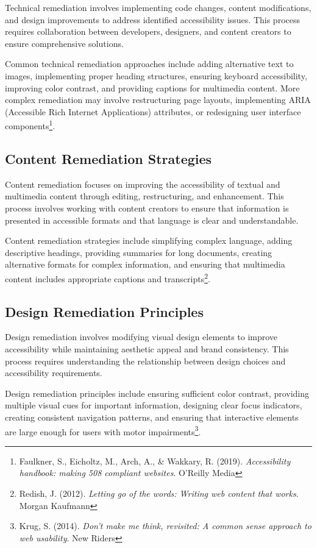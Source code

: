 Technical remediation involves implementing code changes, content modifications, and design improvements to address identified accessibility issues. This process requires collaboration between developers, designers, and content creators to ensure comprehensive solutions.

Common technical remediation approaches include adding alternative text to images, implementing proper heading structures, ensuring keyboard accessibility, improving color contrast, and providing captions for multimedia content. More complex remediation may involve restructuring page layouts, implementing ARIA (Accessible Rich Internet Applications) attributes, or redesigning user interface components\footnote{Faulkner, S., Eicholtz, M., Arch, A., \& Wakkary, R. (2019). \textit{Accessibility handbook: making 508 compliant websites}. O'Reilly Media}.

\subsection{Content Remediation Strategies}

Content remediation focuses on improving the accessibility of textual and multimedia content through editing, restructuring, and enhancement. This process involves working with content creators to ensure that information is presented in accessible formats and that language is clear and understandable.

Content remediation strategies include simplifying complex language, adding descriptive headings, providing summaries for long documents, creating alternative formats for complex information, and ensuring that multimedia content includes appropriate captions and transcripts\footnote{Redish, J. (2012). \textit{Letting go of the words: Writing web content that works}. Morgan Kaufmann}.

\subsection{Design Remediation Principles}

Design remediation involves modifying visual design elements to improve accessibility while maintaining aesthetic appeal and brand consistency. This process requires understanding the relationship between design choices and accessibility requirements.

Design remediation principles include ensuring sufficient color contrast, providing multiple visual cues for important information, designing clear focus indicators, creating consistent navigation patterns, and ensuring that interactive elements are large enough for users with motor impairments\footnote{Krug, S. (2014). \textit{Don't make me think, revisited: A common sense approach to web usability}. New Riders}.

